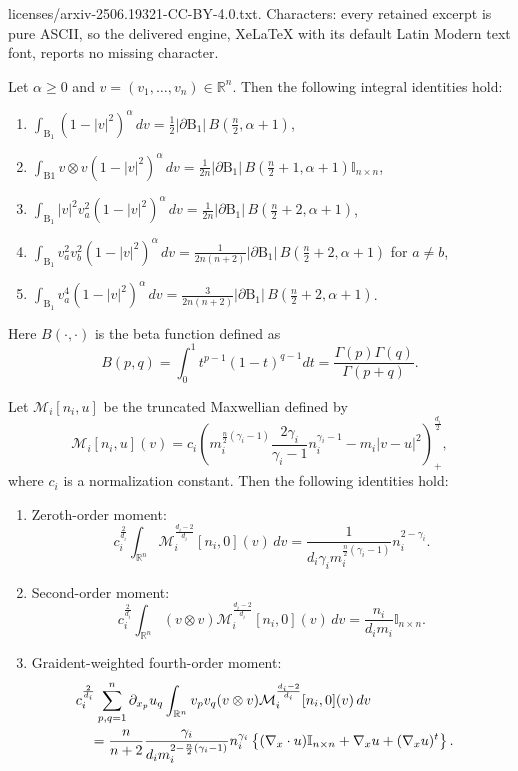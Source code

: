 \documentclass[10pt,a4paper]{amsart}
\newcommand{\R}{\mathbb R}
\newcommand{\pa}{\partial}
\begin{document}
licenses/arxiv-2506.19321-CC-BY-4.0.txt. Characters: every retained excerpt is pure ASCII, so the delivered engine, XeLaTeX with its default Latin Modern text font, reports no missing character.
\begin{lemma}\label{lem_vm0}
Let $\alpha \geq 0$ and $v = (v_1, \dots, v_n) \in \R^n$. Then the following integral identities hold:
\begin{enumerate}[label=(\roman*)]
\item $\displaystyle \int_{\mathrm{B}_1} (1 - |v|^2)^\alpha \, dv = \frac{1}{2} |\partial \mathrm{B}_1| \, B\left(\frac{n}{2}, \alpha + 1\right)$,
\item $\displaystyle \int_{\mathrm{B}1} v \otimes v (1 - |v|^2)^\alpha\, dv = \frac{1}{2n} |\partial \mathrm{B}_1|\, B\left(\frac{n}{2}+1, \alpha + 1\right) \mathbb{I}_{n \times n}$,
\item $\displaystyle \int_{\mathrm{B}_1} |v|^2 v_a^2 (1 - |v|^2)^\alpha \, dv = \frac{1}{2n} |\partial \mathrm{B}_1| \, B\left(\frac{n}{2}+2, \alpha + 1\right)$,
\item $\displaystyle \int_{\mathrm{B}_1} v_a^2 v_b^2 (1 - |v|^2)^\alpha \, dv = \frac{1}{2n(n+2)} |\partial \mathrm{B}_1| \, B\left(\frac{n}{2}+2, \alpha + 1\right)$ for $a \neq b$,
\item $\displaystyle \int_{\mathrm{B}_1} v_a^4 (1 - |v|^2)^\alpha \, dv = \frac{3}{2n(n+2)} |\partial \mathrm{B}_1| \, B\left(\frac{n}{2}+2, \alpha + 1\right)$.
\end{enumerate}
Here $B(\cdot, \cdot)$ is the beta function defined as
$$
B(p,q) = \int_0^1 t^{p-1}(1 - t)^{q-1} dt = \frac{\Gamma(p)\Gamma(q)}{\Gamma(p+q)}.
$$
\end{lemma}

\begin{lemma} Let $\mathcal{M}_i[n_i, u]$ be the truncated Maxwellian defined by
\[
\mathcal{M}_i[n_i,u](v) = c_i \left( m_i^{\frac{n}{2}(\gamma_i-1)} \frac{2\gamma_i}{\gamma_i-1} n_i^{\gamma_i - 1} - m_i |v-u|^2 \right)_+^{\frac{d_i}{2}},
\]
where $c_i$ is a normalization constant. Then the following identities hold:
\begin{enumerate}[label=(\roman*)]
\item[(i)] Zeroth-order moment:
\[
c_i^{\frac{2}{d_i}}\int_{\R^n} \mathcal{M}_i^{\frac{d_i - 2}{d_i}}[n_i, 0](v) \,dv = \frac{1}{d_i \gamma_i m_i^{\frac{n}{2}(\gamma_i - 1)}} n_i^{2 - \gamma_i}.
\]
\item[(ii)] Second-order moment:
\[
c_i^{\frac{2}{d_i}}\int_{\R^n} (v  \otimes v) \mathcal{M}_i^{\frac{d_i - 2}{d_i}}[n_i, 0](v)\,dv = \frac{n_i}{d_i m_i} \mathbb{I}_{n \times n}.
\]
\item[(iii)] Graident-weighted fourth-order moment:
\begin{align*}
&c_i^{\frac{2}{d_i}} \sum_{p,q=1}^n \pa_{x_p} u_q \int_{\R^n} v_p  v_q  (v \otimes v) \mathcal{M}_i^{\frac{d_i - 2}{d_i}}[n_i, 0](v) \, dv \cr
&\quad = \frac{n}{n+2}\frac{\gamma_i}{d_i m_i^{2 - \frac n2(\gamma_i-1)}}n_i^{\gamma_i}\left\{(\nabla_x\cdot u) \mathbb{I}_{n\times n} +\nabla_x u+(\nabla_xu)^t \right\}.
\end{align*}
\end{enumerate}
\end{lemma}
\end{document}

